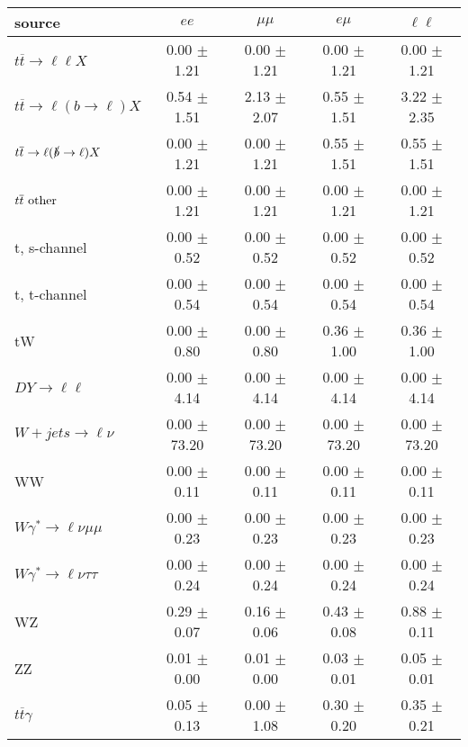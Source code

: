 \begin{tabular}{l|cccc} \hline\hline
source & $ee$ & $\mu\mu$ & $e\mu$ & $\ell\ell $ \\
\hline
$t\overline{t} \rightarrow \ell \ell X$ &  0.00 $\pm$  1.21 &  0.00 $\pm$  1.21 &  0.00 $\pm$  1.21 &  0.00 $\pm$  1.21 \\
$t\overline{t} \rightarrow \ell (b \rightarrow \ell) X$ &  0.54 $\pm$  1.51 &  2.13 $\pm$  2.07 &  0.55 $\pm$  1.51 &  3.22 $\pm$  2.35 \\
$t\overline{t} \rightarrow \ell (\slashed b \rightarrow \ell) X$ &  0.00 $\pm$  1.21 &  0.00 $\pm$  1.21 &  0.55 $\pm$  1.51 &  0.55 $\pm$  1.51 \\
        $t\overline{t}\ \rm{other}$ &  0.00 $\pm$  1.21 &  0.00 $\pm$  1.21 &  0.00 $\pm$  1.21 &  0.00 $\pm$  1.21 \\
\hline
                       t, s-channel &  0.00 $\pm$  0.52 &  0.00 $\pm$  0.52 &  0.00 $\pm$  0.52 &  0.00 $\pm$  0.52 \\
                       t, t-channel &  0.00 $\pm$  0.54 &  0.00 $\pm$  0.54 &  0.00 $\pm$  0.54 &  0.00 $\pm$  0.54 \\
                                 tW &  0.00 $\pm$  0.80 &  0.00 $\pm$  0.80 &  0.36 $\pm$  1.00 &  0.36 $\pm$  1.00 \\
\hline
         $DY \rightarrow \ell \ell$ &  0.00 $\pm$  4.14 &  0.00 $\pm$  4.14 &  0.00 $\pm$  4.14 &  0.00 $\pm$  4.14 \\
      $W+jets \rightarrow \ell \nu$ &  0.00 $\pm$ 73.20 &  0.00 $\pm$ 73.20 &  0.00 $\pm$ 73.20 &  0.00 $\pm$ 73.20 \\
                                 WW &  0.00 $\pm$  0.11 &  0.00 $\pm$  0.11 &  0.00 $\pm$  0.11 &  0.00 $\pm$  0.11 \\
\hline
$W\gamma^{*} \rightarrow \ell \nu \mu\mu$ &  0.00 $\pm$  0.23 &  0.00 $\pm$  0.23 &  0.00 $\pm$  0.23 &  0.00 $\pm$  0.23 \\
$W\gamma^{*} \rightarrow \ell \nu \tau\tau$ &  0.00 $\pm$  0.24 &  0.00 $\pm$  0.24 &  0.00 $\pm$  0.24 &  0.00 $\pm$  0.24 \\
                                 WZ &  0.29 $\pm$  0.07 &  0.16 $\pm$  0.06 &  0.43 $\pm$  0.08 &  0.88 $\pm$  0.11 \\
                                 ZZ &  0.01 $\pm$  0.00 &  0.01 $\pm$  0.00 &  0.03 $\pm$  0.01 &  0.05 $\pm$  0.01 \\
\hline
              $t\overline{t}\gamma$ &  0.05 $\pm$  0.13 &  0.00 $\pm$  1.08 &  0.30 $\pm$  0.20 &  0.35 $\pm$  0.21 \\

\end{tabular}
